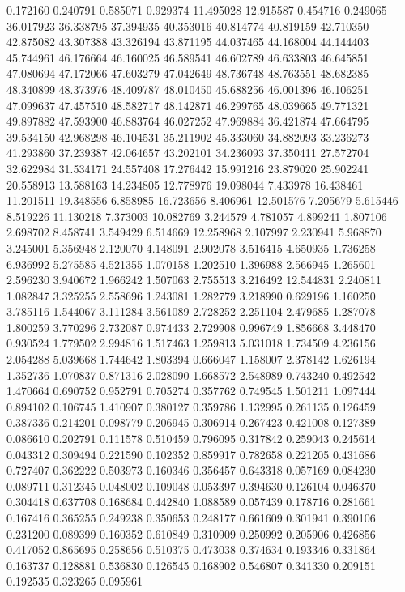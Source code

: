 0.172160
0.240791
0.585071
0.929374
11.495028
12.915587
0.454716
0.249065
36.017923
36.338795
37.394935
40.353016
40.814774
40.819159
42.710350
42.875082
43.307388
43.326194
43.871195
44.037465
44.168004
44.144403
45.744961
46.176664
46.160025
46.589541
46.602789
46.633803
46.645851
47.080694
47.172066
47.603279
47.042649
48.736748
48.763551
48.682385
48.340899
48.373976
48.409787
48.010450
45.688256
46.001396
46.106251
47.099637
47.457510
48.582717
48.142871
46.299765
48.039665
49.771321
49.897882
47.593900
46.883764
46.027252
47.969884
36.421874
47.664795
39.534150
42.968298
46.104531
35.211902
45.333060
34.882093
33.236273
41.293860
37.239387
42.064657
43.202101
34.236093
37.350411
27.572704
32.622984
31.534171
24.557408
17.276442
15.991216
23.879020
25.902241
20.558913
13.588163
14.234805
12.778976
19.098044
7.433978
16.438461
11.201511
19.348556
6.858985
16.723656
8.406961
12.501576
7.205679
5.615446
8.519226
11.130218
7.373003
10.082769
3.244579
4.781057
4.899241
1.807106
2.698702
8.458741
3.549429
6.514669
12.258968
2.107997
2.230941
5.968870
3.245001
5.356948
2.120070
4.148091
2.902078
3.516415
4.650935
1.736258
6.936992
5.275585
4.521355
1.070158
1.202510
1.396988
2.566945
1.265601
2.596230
3.940672
1.966242
1.507063
2.755513
3.216492
12.544831
2.240811
1.082847
3.325255
2.558696
1.243081
1.282779
3.218990
0.629196
1.160250
3.785116
1.544067
3.111284
3.561089
2.728252
2.251104
2.479685
1.287078
1.800259
3.770296
2.732087
0.974433
2.729908
0.996749
1.856668
3.448470
0.930524
1.779502
2.994816
1.517463
1.259813
5.031018
1.734509
4.236156
2.054288
5.039668
1.744642
1.803394
0.666047
1.158007
2.378142
1.626194
1.352736
1.070837
0.871316
2.028090
1.668572
2.548989
0.743240
0.492542
1.470664
0.690752
0.952791
0.705274
0.357762
0.749545
1.501211
1.097444
0.894102
0.106745
1.410907
0.380127
0.359786
1.132995
0.261135
0.126459
0.387336
0.214201
0.098779
0.206945
0.306914
0.267423
0.421008
0.127389
0.086610
0.202791
0.111578
0.510459
0.796095
0.317842
0.259043
0.245614
0.043312
0.309494
0.221590
0.102352
0.859917
0.782658
0.221205
0.431686
0.727407
0.362222
0.503973
0.160346
0.356457
0.643318
0.057169
0.084230
0.089711
0.312345
0.048002
0.109048
0.053397
0.394630
0.126104
0.046370
0.304418
0.637708
0.168684
0.442840
1.088589
0.057439
0.178716
0.281661
0.167416
0.365255
0.249238
0.350653
0.248177
0.661609
0.301941
0.390106
0.231200
0.089399
0.160352
0.610849
0.310909
0.250992
0.205906
0.426856
0.417052
0.865695
0.258656
0.510375
0.473038
0.374634
0.193346
0.331864
0.163737
0.128881
0.536830
0.126545
0.168902
0.546807
0.341330
0.209151
0.192535
0.323265
0.095961
